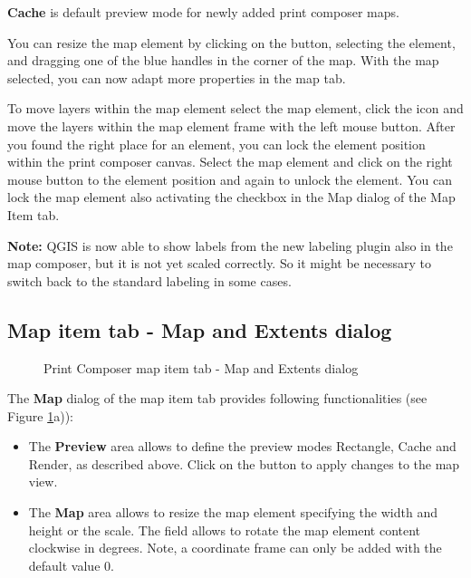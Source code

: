 \textbf{Cache} is default preview mode for newly added print composer maps.

You can resize the map element by clicking on the
 button, selecting the
element, and dragging one of the blue handles in the corner of the map. With
the map selected, you can now adapt more properties in the map 
tab.

To move layers within the map element select the map element, click
the  icon
and move the layers within the map element frame with the left mouse button.
After you found the right place for an element, you can lock the element
position within the print composer canvas. Select the map element and click
on the right mouse button to  the element
position and again to unlock the element. You can lock the map element also
activating the  checkbox in the Map dialog
of the Map Item tab.

\textbf{Note:} QGIS \CURRENT is now able to show labels from the new labeling
plugin also in the map composer, but it is not yet scaled correctly. So it
might be necessary to switch back to the standard labeling in some cases.

\subsection{Map item tab - Map and Extents dialog}

\begin{figure}[ht]
  \centering
    \hspace{1cm}
  \caption{Print Composer map item tab - Map and Extents dialog \nixcaption}\label{fig:mapdialog}
\end{figure}


The \textbf{Map} dialog of the map item tab provides following functionalities
(see Figure \ref{fig:mapdialog}a)):

\begin{itemize}[label=--]
\item The \textbf{Preview} area allows to define the preview modes Rectangle,
Cache and Render, as described above. Click on the 
button to apply changes to the map view.
\item The \textbf{Map} area allows to resize the map element specifying the
width and height or the scale. The  field allows to
rotate the map element content clockwise in degrees. Note, a coordinate frame
can only be added with the default value 0.
\end{itemize}

